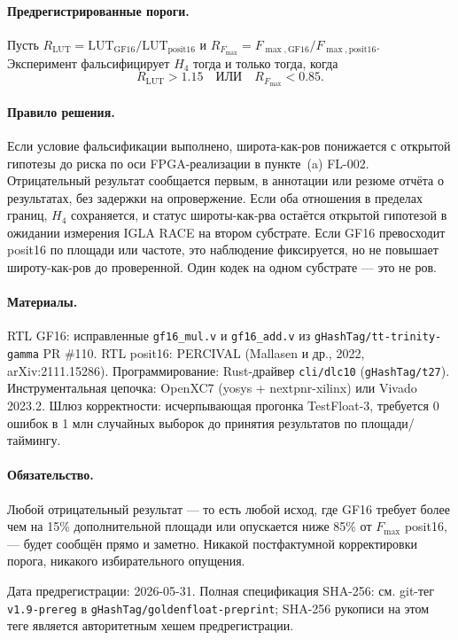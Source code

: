 \documentclass[11pt,a4paper]{article}
\theoremstyle{plain}
\begin{document}
\paragraph{Предрегистрированные пороги.}
Пусть \(R_{\mathrm{LUT}} = \mathrm{LUT}_{\mathrm{GF16}} / \mathrm{LUT}_{\mathrm{posit16}}\)
и \(R_{F_{\max}} = F_{\max,\mathrm{GF16}} / F_{\max,\mathrm{posit16}}\).
Эксперимент фальсифицирует \(H_4\) тогда и только тогда, когда
\[
R_{\mathrm{LUT}} > 1.15 \quad \text{ИЛИ} \quad R_{F_{\max}} < 0.85.
\]

\paragraph{Правило решения.}
Если условие фальсификации выполнено, широта-как-ров понижается с открытой
гипотезы до риска по оси FPGA-реализации в пункте~(a) FL-002. Отрицательный результат
сообщается первым, в аннотации или резюме отчёта о результатах, без задержки на
опровержение.
Если оба отношения в пределах границ, \(H_4\) сохраняется, и статус
широты-как-рва остаётся открытой гипотезой в ожидании измерения IGLA RACE на
втором субстрате.
Если GF16 превосходит posit16 по площади или частоте, это наблюдение
фиксируется, но не повышает широту-как-ров до проверенной. Один кодек на одном
субстрате --- это не ров.

\paragraph{Материалы.}
RTL GF16: исправленные \texttt{gf16\_mul.v} и \texttt{gf16\_add.v} из
\texttt{gHashTag/tt-trinity-gamma} PR \#110.
RTL posit16: PERCIVAL (Mallasen и др., 2022, arXiv:2111.15286).
Программирование: Rust-драйвер \texttt{cli/dlc10} (\texttt{gHashTag/t27}).
Инструментальная цепочка: OpenXC7 (yosys + nextpnr-xilinx) или Vivado 2023.2.
Шлюз корректности: исчерпывающая прогонка TestFloat-3, требуется 0 ошибок в
1 млн случайных выборок до принятия результатов по площади/таймингу.

\paragraph{Обязательство.}
Любой отрицательный результат --- то есть любой исход, где GF16 требует более
чем на 15\% дополнительной площади или опускается ниже 85\% от \(F_{\max}\)
posit16, --- будет сообщён прямо и заметно. Никакой постфактумной корректировки
порога, никакого избирательного опущения.

Дата предрегистрации: 2026-05-31.
Полная спецификация SHA-256: см. git-тег \texttt{v1.9-prereg} в
\texttt{gHashTag/goldenfloat-preprint}; SHA-256 рукописи на этом теге является
авторитетным хешем предрегистрации.
\end{document}
